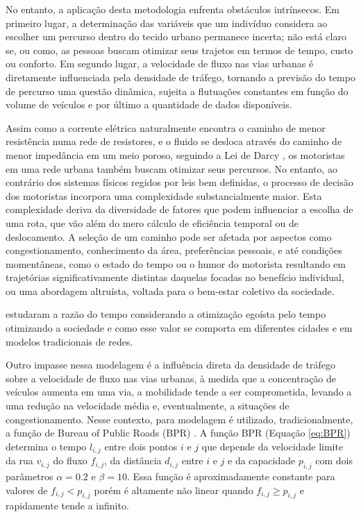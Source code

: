 \documentclass{article}
\begin{document}
No entanto, a aplicação desta metodologia enfrenta obstáculos intrínsecos. Em primeiro lugar, a determinação das variáveis que um indivíduo considera ao escolher um percurso dentro do tecido urbano permanece incerta; não está claro se, ou como, as pessoas buscam otimizar seus trajetos em termos de tempo, custo ou conforto. Em segundo lugar, a velocidade de fluxo nas vias urbanas é diretamente influenciada pela densidade de tráfego, tornando a previsão do tempo de percurso uma questão dinâmica, sujeita a flutuações constantes em função do volume de veículos e por último a quantidade de dados disponíveis.


Assim como a corrente elétrica naturalmente encontra o caminho de menor resistência numa rede de resistores, e o fluido se desloca através do caminho de menor impedância em um meio poroso, seguindo a Lei de Darcy \citep{darcy}, os motoristas em uma rede urbana também buscam otimizar seus percursos. No entanto, ao contrário dos sistemas físicos regidos por leis bem definidas, o processo de decisão dos motoristas incorpora uma complexidade substancialmente maior. Esta complexidade deriva da diversidade de fatores que podem influenciar a escolha de uma rota, que vão além do mero cálculo de eficiência temporal ou de deslocamento. A seleção de um caminho pode ser afetada por aspectos como congestionamento, conhecimento da área, preferências pessoais, e até condições momentâneas, como o estado do tempo ou o humor do motorista resultando em trajetórias significativamente distintas daquelas focadas no benefício individual, ou uma abordagem altruísta, voltada para o bem-estar coletivo da sociedade. 

\citet{Anarchy} estudaram a razão do tempo considerando a otimização egoísta pelo tempo otimizando a sociedade e como esse valor se comporta em diferentes cidades e em modelos tradicionais de redes. 


Outro impasse nessa modelagem é a influência direta da densidade de tráfego sobre a velocidade de fluxo nas vias urbanas, à medida que a concentração de veículos aumenta em uma via, a mobilidade tende a ser comprometida, levando a uma redução na velocidade média e, eventualmente, a situações de congestionamento. Nesse contexto, para modelagem é utilizado, tradicionalmente, a função de Bureau of Public Roads (BPR) \citep{Dial2006,Anarchy,Ambhl2023}. A função BPR (Equação \ref{eq:BPR}) determina o tempo $l_{i,j}$ entre dois pontos $i$ e $j$ que depende da velocidade limite da rua $v_{i,j}$ do fluxo $f_{i,j}$, da distância $d_{i,j}$ entre $i$ e $j$ e da capacidade $p_{i,j}$ com dois parâmetros $\alpha = 0.2$ e $\beta = 10 $\citep{Anarchy}. Essa função é aproximadamente constante para valores de $f_{i,j} < p_{i,j}$ porém é altamente não linear quando $f_{i,j} \geq p_{i,j}$ e rapidamente tende a infinito.
\end{document}
